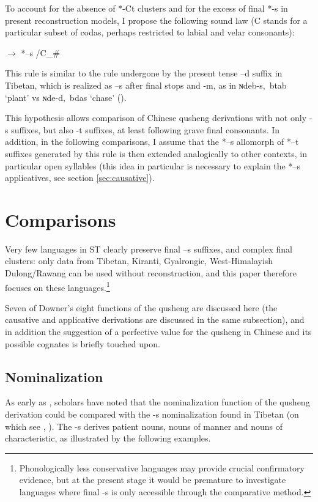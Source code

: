 \documentclass[oldfontcommands,oneside,a4paper,11pt]{article}
\newcommand{\ipa}[1]{{\phon \mbox{#1}}} %
\begin{document}
To account for the absence of *-Ct clusters and for the excess of final *-s in present reconstruction models, I propose the following sound law (C stands for a particular subset of codas, perhaps restricted to labial and velar consonants):

\begin{exe}
\ex \label{ex:ts}
\glt *\ipa{--t} $\rightarrow$ *\ipa{--s} /C\_\# 
\end{exe}

This rule is similar to the rule undergone by the present tense \ipa{--d} suffix in Tibetan, which is realized as \ipa{--s} after final stops and \ipa{-m}, as in \ipa{ɴdeb-s, btab}   `plant' vs \ipa{ɴde-d, bdas}   `chase' (\citealt[52-53]{coblin76}). 

This hypothesis allows comparison of Chinese qusheng derivations with not only \ipa{-s} suffixes, but also \ipa{-t} suffixes, at least following grave final consonants. In addition, in the following comparisons, I assume that the *\ipa{--s} allomorph of *\ipa{--t} suffixes generated by this rule is then extended analogically to other contexts, in particular open syllables (this idea in particular is necessary to explain the *\ipa{--s} applicatives, see section \ref{sec:causative}).


\section{Comparisons}

Very few languages in ST clearly preserve final \ipa{--s} suffixes, and complex final clusters: only data from Tibetan, Kiranti, Gyalrongic, West-Himalayish Dulong/Rawang can be used without reconstruction, and this paper therefore focuses on these languages.\footnote{Phonologically less conservative languages may provide crucial confirmatory evidence, but at the present stage it would be premature to investigate languages where final \ipa{-s} is only accessible through the comparative method. }

Seven of Downer's eight functions of the qusheng are discussed here (the causative and applicative derivations are discussed in the same subsection), and in addition the suggestion of a perfective value for the qusheng in Chinese and its possible cognates is briefly touched upon.

\subsection{Nominalization} \label{sec:nmlz}
As early as \citet{forrest60occlusives}, scholars have noted that the nominalization function of the qusheng derivation could be compared with the \ipa{-s} nominalization found in Tibetan (on which see \citealt[43]{conrady1896}, \citealt[624-5]{hill14derivational}). The \ipa{-s} derives patient nouns, nouns of manner and nouns of characteristic, as illustrated by the following examples. 
\end{document}

